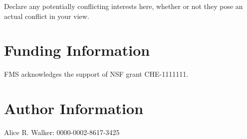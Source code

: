 \documentclass[9pt,review]{livecoms}
\begin{document}
Declare any potentially conflicting interests here, whether or not they pose an actual conflict in your view.

\section*{Funding Information}
FMS acknowledges the support of NSF grant CHE-1111111.

\section*{Author Information}
\makeorcid
Alice R. Walker: 0000-0002-8617-3425




\end{document}
